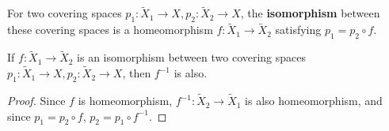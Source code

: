 \begin{defn} For two covering spaces $p_1:\tilde{X}_1\rightarrow X, p_2:\tilde{X}_2\rightarrow X$, the \textbf{isomorphism} between these covering spaces is a homeomorphism $f:\tilde{X}_1\rightarrow \tilde{X}_2$ satisfying $p_1=p_2\circ f$.
\end{defn}
\begin{cor} If $f:\tilde{X}_1\rightarrow \tilde{X}_2$ is an isomorphism between two covering spaces $p_1:\tilde{X}_1\rightarrow X, p_2:\tilde{X}_2\rightarrow X$, then $f^{-1}$ is also.
\end{cor}
\begin{proof}
Since $f$ is homeomorphism, $f^{-1}:\tilde{X}_2\rightarrow \tilde{X}_1$ is also homeomorphism, and since $p_1=p_2\circ f$, $p_2=p_1\circ f^{-1}$.
\end{proof}

